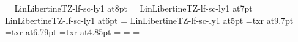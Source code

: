 \font\eightcapsbf=       LinLibertineTZ-lf-sc-ly1 at8pt
\font\sevencapsbf=       LinLibertineTZ-lf-sc-ly1 at7pt
\font\sixcapsbf=         LinLibertineTZ-lf-sc-ly1 at6pt
\font\fivecapsbf=        LinLibertineTZ-lf-sc-ly1 at5pt
%
\font\tenmiss=txr at9.7pt
\font\sevenmiss=txr at6.79pt
\font\fivemiss=txr at4.85pt
%
\newfam\misscharfam
\textfont\misscharfam=\tenmiss
\scriptfont\misscharfam=\sevenmiss
\scriptscriptfont\misscharfam=\fivemiss
%
\def\Gamma{{\fam=\misscharfam \mathchar"7800}}%
\def\Delta{{\fam=\misscharfam \mathchar"7801}}%
\def\Theta{{\fam=\misscharfam \mathchar"7802}}%
\def\Lambda{{\fam=\misscharfam \mathchar"7803}}%
\def\Xi{{\fam=\misscharfam \mathchar"7804}}%
\def\Pi{{\fam=\misscharfam \mathchar"7805}}%
\def\Sigma{{\fam=\misscharfam \mathchar"7806}}%
\def\Upsilon{{\fam=\misscharfam \mathchar"7807}}%
\def\Phi{{\fam=\misscharfam \mathchar"7808}}%
\def\Psi{{\fam=\misscharfam \mathchar"7809}}%
\def\Omega{{\fam=\misscharfam \mathchar"780A}}%
%
\def\loadmsam{\font\tenmsa=txsya at9.7pt \font\sevenmsa=txsya at6.79pt \font\fivemsa=txsya at4.85pt \fam\msafam \textfont\msafam=\tenmsa \scriptfont\msafam=\sevenmsa \scriptscriptfont\msafam=\fivemsa \global\let\loadmsam\empty}%
\def\loadmsbm{\font\tenmsb=txsyb at9.7pt\font\sevenmsb=txsyb at6.79pt\font\fivemsb=txsyb at4.85pt \fam\msbfam \textfont\msbfam=\tenmsb \scriptfont\msbfam=\sevenmsb \scriptscriptfont\msbfam=\fivemsb \global\let\loadmsbm\empty}%
\def\UseAMSsymbols{\loadmsam\loadmsbm}%
%
%
\rm